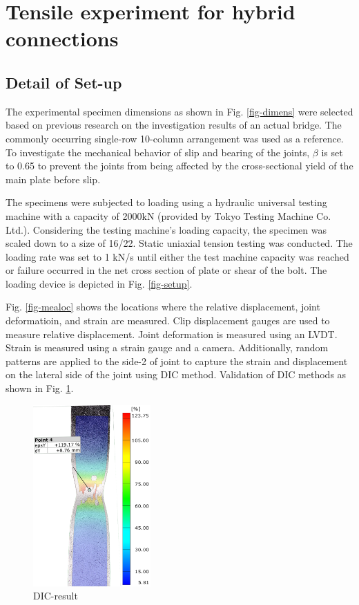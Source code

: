 \section{Tensile experiment for hybrid connections}
\subsection{Detail of Set-up}

The experimental specimen dimensions as shown in Fig. \ref{fig-dimens} were selected based on previous research\cite{KAMEI2000} on the investigation results of an actual bridge. The commonly occurring single-row 10-column arrangement was used as a reference. To investigate the mechanical behavior of slip and bearing of the joints, $\beta$ is set to 0.65 to prevent the joints from being affected by the cross-sectional yield of the main plate before slip.

The specimens were subjected to loading using a hydraulic universal testing machine with a capacity of 2000kN (provided by Tokyo Testing Machine Co. Ltd.). Considering the testing machine's loading capacity, the specimen was scaled down to a size of 16/22. Static uniaxial tension testing was conducted. The loading rate was set to 1 kN/s until either the test machine capacity was reached or failure occurred in the net cross section of plate or shear of the bolt. The loading device is depicted in Fig. \ref{fig-setup}.

Fig. \ref{fig-mealoc} shows the locations where the relative displacement, joint deformatioin, and strain are measured. Clip displacement gauges are used to measure relative displacement. Joint deformation is measured using an LVDT. Strain is measured using a strain gauge and a camera. Additionally, random patterns are applied to the side-2 of joint to capture the strain and displacement on the lateral side of the joint using \ac{DIC} method. Validation of \ac{DIC} methods as shown in Fig. \ref{fig-dicresult}.

\begin{figure}[htbp]
    \centering
    \includegraphics[width=0.4\textwidth]{imgs/ch6/DIC-RESULT.jpg}
    \caption{DIC-result}
    \label{fig-dicresult}
\end{figure}



